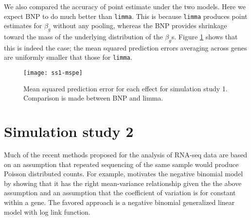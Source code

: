 We also compared the accuracy of point estimate under the two models. Here we expect BNP to do much better than \texttt{limma}. This is because \texttt{limma} produces point estimates for $\beta_g$ without any pooling, whereas the BNP provides shrinkage toward the mass of the underlying distribution of the $\beta_g$s. Figure \ref{mspe-ss1} shows that this is indeed the case; the mean squared prediction errors averaging across genes are uniformly smaller that those for \texttt{limma}.

\begin{figure}[ht!]
\centering
\texttt{[image: ss1-mspe]}
\caption{Mean squared prediction error for each effect for simulation study 1. Comparison is made between BNP and limma.}
\label{mspe-ss1}
\end{figure}

\section{Simulation study 2}
Much of the recent methods proposed for the analysis of RNA-seq data are based on an assumption that repeated sequencing of the same sample would produce Poisson distributed counts. For example, \cite{mccarthy} motivates the negative binomial model by showing that it has the right mean-variance relationship given the the above assumption and an assumption that the coefficient of variation is for constant within a gene. The favored approach is a negative binomial generalized linear model with log link function.

